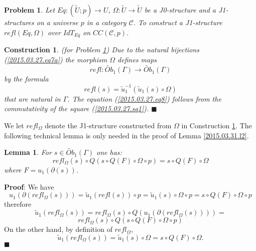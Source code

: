 \documentclass[12pt]{article}
\numberwithin{equation}{section}
\newenvironment{myproof}{{\bf Proof}:}{$\blacksquare$ \vskip 5mm }
\newtheorem{lemma}[proposition]{Lemma}
\newtheorem{problem}[proposition]{Problem}
\newtheorem{construction0}[proposition]{Construction}
\newenvironment{construction}[1]{\begin{construction0}(for Problem \ref{#1})}{$\blacksquare$ \end{construction0}}
\newcommand{\llabel}[1]{\label{#1}}
\newcommand{\sr}{\rightarrow}
\newcommand{\wt}{\widetilde}
\newcommand{\toCC}{CC} %
\begin{document}
%
\begin{problem}
\llabel{2015.03.27.prob4} Let $Eq:(\wt{U};p)\sr U$, $\Omega:\wt{U}\sr \wt{U}$
be a J0-structure and a J1-structures on a universe $p$ in a category $\mathcal
C$. To construct a J1-structure $refl(Eq,\Omega)$ over $IdT_{Eq}$ on
$\toCC({\mathcal C},p)$.
\end{problem}
%
\begin{construction}{2015.03.27.prob4}\rm
\llabel{2015.03.27.constr4} Due to the natural bijections
(\ref{2015.03.27.eq7a}) the morphism $\Omega$ defines maps
%
$$refl:\wt{Ob}_1(\Gamma)\sr \wt{Ob}_1(\Gamma)$$
%
by the formula
%
$$refl(s)=\wt{u}_1^{-1}(\wt{u}_1(s)\circ \Omega)$$
%
that are natural in $\Gamma$. The equation (\ref{2015.03.27.eq8}) follows from
the commutativity of the square (\ref{2015.03.27.sq1}).
\end{construction}
%
We let $refl_{\Omega}$ denote the J1-structure constructed from $\Omega$ in
Construction \ref{2015.03.27.constr4}.
%
The following technical lemma is only needed in the proof of Lemma
\ref{2015.03.31.l2}.
%
\begin{lemma}
\llabel{2015.04.02.l3} For $s\in \wt{Ob}_1(\Gamma)$ one has:
%
$$refl_{\Omega}(s)\circ Q(s\circ Q(F)\circ \Omega\circ p)=s\circ Q(F)\circ
\Omega$$
%
where $F=u_1(\partial(s))$.
\end{lemma}
%
\begin{myproof}
We have
%
$$u_1(\partial(refl_{\Omega}(s)))=\wt{u}_1(refl(s))\circ p=\wt{u}_1(s)\circ
\Omega\circ p=s\circ Q(F)\circ \Omega\circ p$$
%
therefore
%
$$\wt{u}_1(refl_{\Omega}(s))=refl_{\Omega}(s)\circ
Q(u_1(\partial(refl_{\Omega}(s))))=$$
$$refl_{\Omega}(s)\circ Q(s\circ Q(F)\circ \Omega\circ p)$$
%
On the other hand, by definition of $refl_{\Omega}$,
%
$$\wt{u}_1(refl_{\Omega}(s))=\wt{u}_1(s)\circ \Omega=s\circ Q(F)\circ \Omega.$$
%
\end{myproof}
\end{document}
